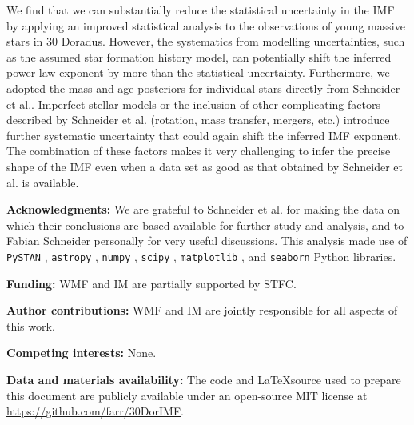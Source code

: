 \documentclass[12pt]{article}
\begin{document}
We find that we can substantially reduce the statistical uncertainty in the IMF by applying an improved statistical analysis to the observations of young massive stars in 30 Doradus.  However, the systematics from modelling uncertainties, such as the assumed star formation history model, can potentially shift the inferred power-law exponent by more than the statistical uncertainty.   Furthermore, we adopted the mass and age posteriors for individual stars directly from Schneider et al.\cite{Schneider:2018}.  Imperfect stellar models or the inclusion of other complicating factors described by Schneider et al.\cite{Schneider:2018} (rotation, mass transfer, mergers, etc.) introduce further systematic uncertainty that could again shift the inferred IMF exponent.
The combination of these factors makes it very challenging to infer the precise shape of the IMF even when a data set as good as that obtained by Schneider et al.\cite{Schneider:2018} is available.


{\bf Acknowledgments:} We are grateful to Schneider et al.\cite{Schneider:2018} for making the data on which their conclusions are based available for further study and analysis, and to Fabian Schneider personally for very useful discussions.  This analysis made use of \texttt{PySTAN} \cite{PySTAN}, \texttt{astropy} \cite{astropy}, \texttt{numpy} \cite{numpy}, \texttt{scipy} \cite{scipy}, \texttt{matplotlib} \cite{matplotlib}, and \texttt{seaborn} \cite{seaborn} Python libraries.

{\bf Funding:} WMF and IM are partially supported by STFC.

{\bf Author contributions:} WMF and IM are jointly responsible for all aspects of this work.

{\bf Competing interests:} None.

{\bf Data and materials availability:} The code and \LaTeX source used to prepare this document are publicly available under an open-source MIT license at \url{https://github.com/farr/30DorIMF}.




\end{document}
